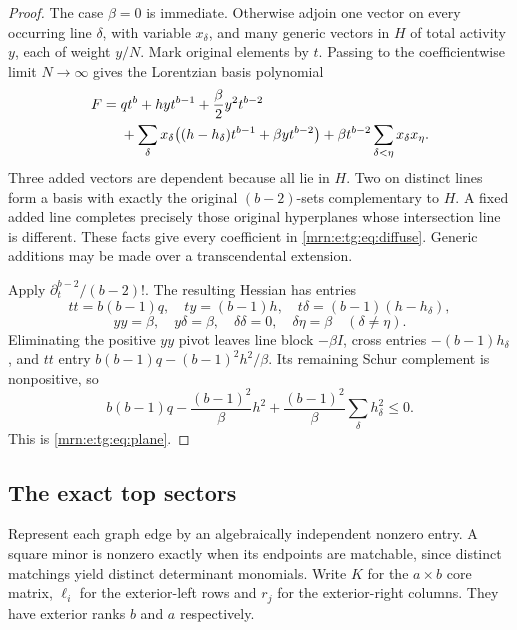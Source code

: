 \documentclass[11pt,a4paper]{article}
\theoremstyle{remark}\newtheorem{remark}[theorem]{Remark}
\begin{document}
\begin{proof}
The case $\beta=0$ is immediate. Otherwise adjoin one vector on every occurring line $\delta$, with variable $x_\delta$, and many generic vectors in $H$ of total activity $y$, each of weight $y/N$. Mark original elements by $t$. Passing to the coefficientwise limit $N\to\infty$ gives the Lorentzian basis polynomial
\begin{align}
 F={}&qt^b+hyt^{b-1}+\frac\beta2 y^2t^{b-2}\notag\\
 &+\sum_\delta x_\delta\bigl((h-h_\delta)t^{b-1}+\beta yt^{b-2}\bigr)
 +\beta t^{b-2}\sum_{\delta<\eta}x_\delta x_\eta.\label{mrn:e:tg:eq:diffuse}
\end{align}
Three added vectors are dependent because all lie in $H$. Two on distinct lines form a basis with exactly the original $(b-2)$-sets complementary to $H$. A fixed added line completes precisely those original hyperplanes whose intersection line is different. These facts give every coefficient in \eqref{mrn:e:tg:eq:diffuse}. Generic additions may be made over a transcendental extension.

Apply $\partial_t^{b-2}/(b-2)!$. The resulting Hessian has entries
\[
 tt=b(b-1)q,\quad ty=(b-1)h,\quad t\delta=(b-1)(h-h_\delta),
\]
\[
 yy=\beta,\quad y\delta=\beta,\quad\delta\delta=0,
 \quad\delta\eta=\beta\quad(\delta\ne\eta).
\]
Eliminating the positive $yy$ pivot leaves line block $-\beta I$, cross entries $-(b-1)h_\delta$, and $tt$ entry $b(b-1)q-(b-1)^2h^2/\beta$. Its remaining Schur complement is nonpositive, so
\[
 b(b-1)q-\frac{(b-1)^2}{\beta}h^2
 +\frac{(b-1)^2}{\beta}\sum_\delta h_\delta^2\le0.
\]
This is \eqref{mrn:e:tg:eq:plane}.
\end{proof}

\subsection{The exact top sectors}
Represent each graph edge by an algebraically independent nonzero entry. A square minor is nonzero exactly when its endpoints are matchable, since distinct matchings yield distinct determinant monomials. Write $K$ for the $a\times b$ core matrix, $\ell_i$ for the exterior-left rows and $r_j$ for the exterior-right columns. They have exterior ranks $b$ and $a$ respectively.
\end{document}
